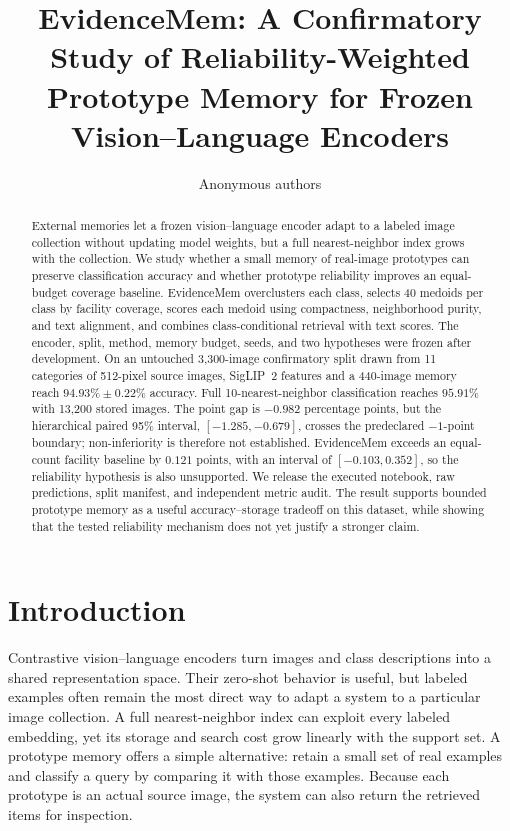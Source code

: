 \documentclass[10pt,twocolumn]{article}
\title{EvidenceMem: A Confirmatory Study of Reliability-Weighted Prototype
Memory for Frozen Vision--Language Encoders}
\author{Anonymous authors}
\date{}
\newcommand{\method}{EvidenceMem}
\begin{document}
\maketitle

\begin{abstract}
External memories let a frozen vision--language encoder adapt to a labeled image
collection without updating model weights, but a full nearest-neighbor index grows with
the collection. We study whether a small memory of real-image prototypes can preserve
classification accuracy and whether prototype reliability improves an equal-budget
coverage baseline. \method{} overclusters each class, selects 40 medoids per class by
facility coverage, scores each medoid using compactness, neighborhood purity, and
text alignment, and combines class-conditional retrieval with text scores. The encoder,
split, method, memory budget, seeds, and two hypotheses were frozen after development.
On an untouched 3,300-image confirmatory split drawn from 11 categories of 512-pixel
source images, SigLIP~2 features and a 440-image memory reach
$94.93\%\pm0.22\%$ accuracy. Full 10-nearest-neighbor classification reaches
$95.91\%$ with 13,200 stored images. The point gap is $-0.982$ percentage points, but
the hierarchical paired 95\% interval, $[-1.285,-0.679]$, crosses the predeclared
$-1$-point boundary; non-inferiority is therefore not established. \method{} exceeds
an equal-count facility baseline by $0.121$ points, with an interval of
$[-0.103,0.352]$, so the reliability hypothesis is also unsupported. We release the
executed notebook, raw predictions, split manifest, and independent metric audit. The
result supports bounded prototype memory as a useful accuracy--storage tradeoff on this
dataset, while showing that the tested reliability mechanism does not yet justify a
stronger claim.
\end{abstract}

\section{Introduction}

Contrastive vision--language encoders turn images and class descriptions into a shared
representation space. Their zero-shot behavior is useful, but labeled examples often
remain the most direct way to adapt a system to a particular image collection. A full
nearest-neighbor index can exploit every labeled embedding, yet its storage and search
cost grow linearly with the support set. A prototype memory offers a simple alternative:
retain a small set of real examples and classify a query by comparing it with those
examples. Because each prototype is an actual source image, the system can also return
the retrieved items for inspection.
\end{document}
